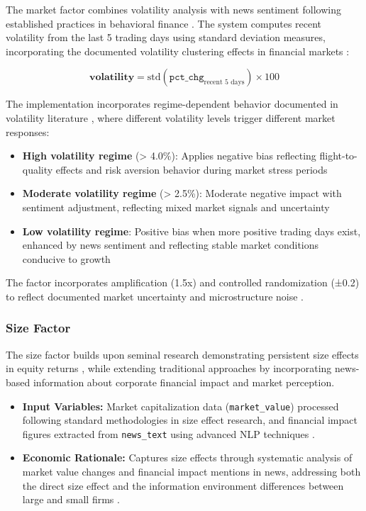 \documentclass[3p,times,procedia]{elsarticle}
\begin{document}
The market factor combines volatility analysis with news sentiment following established practices in behavioral finance \cite{Daniel1998}. The system computes recent volatility from the last 5 trading days using standard deviation measures, incorporating the documented volatility clustering effects in financial markets \cite{Engle1982}:

\begin{equation}
\textbf{volatility} = \text{std}(\texttt{pct\_chg}_{\text{recent 5 days}}) \times 100
\end{equation}

The implementation incorporates regime-dependent behavior documented in volatility literature \cite{Glosten1993}, where different volatility levels trigger different market responses:

\begin{itemize}
    \item \textbf{High volatility regime} (> 4.0\%): Applies negative bias reflecting flight-to-quality effects and risk aversion behavior during market stress periods
    
    \item \textbf{Moderate volatility regime} (> 2.5\%): Moderate negative impact with sentiment adjustment, reflecting mixed market signals and uncertainty  
    
    \item \textbf{Low volatility regime}: Positive bias when more positive trading days exist, enhanced by news sentiment and reflecting stable market conditions conducive to growth
\end{itemize}

The factor incorporates amplification (1.5x) and controlled randomization (±0.2) to reflect documented market uncertainty and microstructure noise \cite{Campbell2001}.

\subsubsection{{Size Factor}}

The size factor builds upon seminal research demonstrating persistent size effects in equity returns \cite{Banz1981}, while extending traditional approaches by incorporating news-based information about corporate financial impact and market perception.

\begin{itemize}
    \item \textbf{Input Variables:} Market capitalization data (\texttt{market\_value}) processed following standard methodologies in size effect research, and financial impact figures extracted from \texttt{news\_text} using advanced NLP techniques \cite{Loughran2011}.
    \item \textbf{Economic Rationale:} Captures size effects through systematic analysis of market value changes and financial impact mentions in news, addressing both the direct size effect and the information environment differences between large and small firms \cite{Banz1981}.
\end{itemize}
\end{document}
